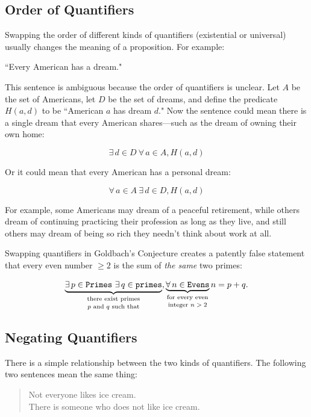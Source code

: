 \documentclass[11pt,oneside]{book}
\theoremstyle{definition}
\begin{document}
\subsection{Order of Quantifiers}
Swapping the order of different kinds of quantifiers (existential or universal) usually changes the meaning of a proposition.
For example:

\begin{center}
    ``Every American has a dream."
\end{center}

This sentence is ambiguous because the order of quantifiers is unclear.
Let $A$ be the set of Americans, let $D$ be the set of dreams, and define the predicate $H(a, d)$ to be ``American $a$ has dream $d$."
Now the sentence could mean there is a single dream that every American shares—such as the dream of owning their own home:

\[ \exists\, d \in D\ \forall\, a \in A, H(a, d) \]

Or it could mean that every American has a personal dream:

\[ \forall\, a \in A\ \exists\, d \in D, H(a, d) \]

For example, some Americans may dream of a peaceful retirement, while others dream of continuing practicing their profession as long as they live, and still others may dream of being so rich they needn't think about work at all.

Swapping quantifiers in Goldbach's Conjecture creates a patently false statement that every even number $\geq 2$ is the sum of \emph{the same} two primes:

\[ \underbrace{\exists\, p \in \texttt{Primes}\ \exists\, q \in \texttt{primes}}_{\text{\shortstack{there exist primes\\$p$ and $q$ such that}}}, \underbrace{\forall\, n \in \texttt{Evens}}_{\text{\shortstack{for every even\\integer $n > 2$}}} n = p + q. \]


\subsection{Negating Quantifiers}
There is a simple relationship between the two kinds of quantifiers.
The following two sentences mean the same thing:

\begin{quote}
    Not everyone likes ice cream. \\
    There is someone who does not like ice cream.
\end{quote}
\end{document}
